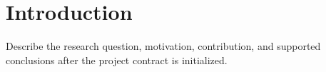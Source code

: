 \section{Introduction}
\label{sec:introduction}

Describe the research question, motivation, contribution, and supported
conclusions after the project contract is initialized.

